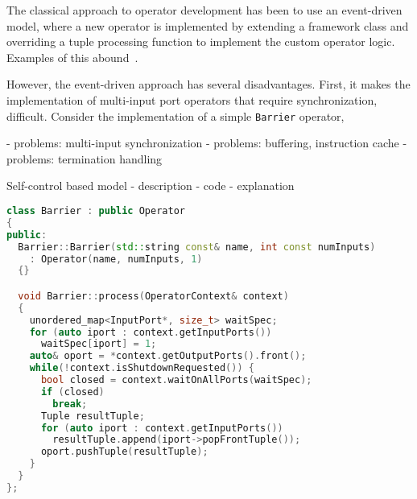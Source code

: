The classical approach to operator development has been to use an event-driven
model, where a new operator is implemented by extending a framework class and
overriding a tuple processing function to implement the custom operator logic.
Examples of this abound~\cite{ref:storm, ref:s4, ref:spl, ref:spb-opdev}.

However, the event-driven approach has several disadvantages. First, it makes
the implementation of multi-input port operators that require synchronization,
difficult. Consider the implementation of a simple \texttt{Barrier} operator,


- problems: multi-input synchronization
- problems: buffering, instruction cache
- problems: termination handling

Self-control based model
- description
- code
- explanation


\begin{lstlisting}[language=C++, 
  caption={Flow composition in C-Stream.}, label=code:oper-def, captionpos=b,
  xleftmargin=0.25cm, columns=flexible, basicstyle={\scriptsize\ttfamily}]
class Barrier : public Operator
{
public:
  Barrier::Barrier(std::string const& name, int const numInputs)
    : Operator(name, numInputs, 1) 
  {}

  void Barrier::process(OperatorContext& context)
  {
    unordered_map<InputPort*, size_t> waitSpec;
    for (auto iport : context.getInputPorts())
      waitSpec[iport] = 1;
    auto& oport = *context.getOutputPorts().front();
    while(!context.isShutdownRequested()) {
      bool closed = context.waitOnAllPorts(waitSpec);
      if (closed)
        break;
      Tuple resultTuple;
      for (auto iport : context.getInputPorts())
        resultTuple.append(iport->popFrontTuple());
      oport.pushTuple(resultTuple);
    }
  }
};
\end{lstlisting}

